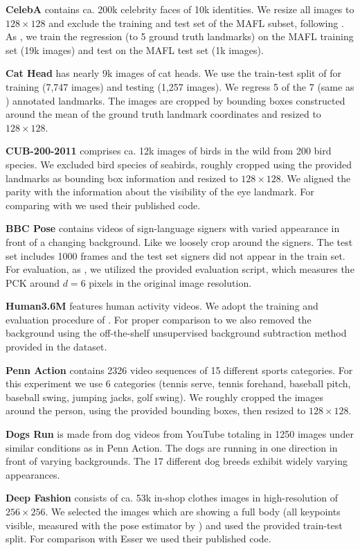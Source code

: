 \textbf{CelebA} \cite{liu15facewild} contains ca. 200k celebrity faces of 10k identities.
We resize all images to $128\times 128$ and exclude the training and test set of the MAFL subset, following \cite{thewlis17}.
As  \cite{thewlis17, zhang18}, we train the regression (to 5 ground truth landmarks) on the MAFL training set (19k images) and test on the MAFL test set (1k images).

\textbf{Cat Head} \cite{zhang08cathead}  has nearly 9k images of cat heads.
We use the train-test split of \cite{zhang18} for training (7,747 images) and testing (1,257 images).
We regress 5 of the 7 (same as \cite{zhang18}) annotated landmarks.
The images are cropped by bounding boxes constructed around the mean of the ground truth landmark coordinates and resized to $128\times128$.


\textbf{CUB-200-2011} \cite{wah11birds} comprises ca. 12k images of birds in the wild from 200 bird species.
We excluded bird species of seabirds, roughly cropped using the provided landmarks as bounding box information and resized to $128\times128$.
We aligned the parity with the information about the visibility of the eye landmark.
For comparing with \cite{zhang18} we used their published code.


\textbf{BBC Pose} \cite{charles13bbcpose} contains videos of sign-language signers with varied appearance in front of a changing background. Like \cite{jakab18} we loosely crop around the signers.
The test set includes 1000 frames and the test set signers did not appear in the train set.
For evaluation, as \cite{jakab18}, we utilized the provided evaluation script, which measures the PCK around $d=6$ pixels in the original image resolution.


\textbf{Human3.6M} \cite{ionescu14human36m} features human activity videos.
We adopt the training and evaluation procedure of \cite{zhang18}.
For proper comparison to \cite{zhang18} we also removed the background using the off-the-shelf unsupervised background subtraction method provided in the dataset.


\textbf{Penn Action} \cite{zhang13penn} contains 2326 video sequences of 15 different sports categories.
For this experiment we use 6 categories (tennis serve, tennis forehand, baseball pitch, baseball swing, jumping jacks, golf swing).
We roughly cropped the images around the person, using the provided bounding boxes, then resized to $128\times128$.


\textbf{Dogs Run} is made from dog videos from YouTube totaling in 1250 images under similar conditions as in Penn Action. The dogs are running in one direction in front of varying backgrounds. The 17 different dog breeds exhibit widely varying appearances.


\textbf{Deep Fashion} \cite{liu16deepfashion, liu16deepfashionwild} consists of ca. 53k in-shop clothes images in high-resolution of $256 \times 256$. We selected the images which are showing a full body (all keypoints visible, measured with the pose estimator by \cite{cao17affinityfield}) and used the provided train-test split.
For comparison with Esser \etal \cite{esser18} we used their published code.


